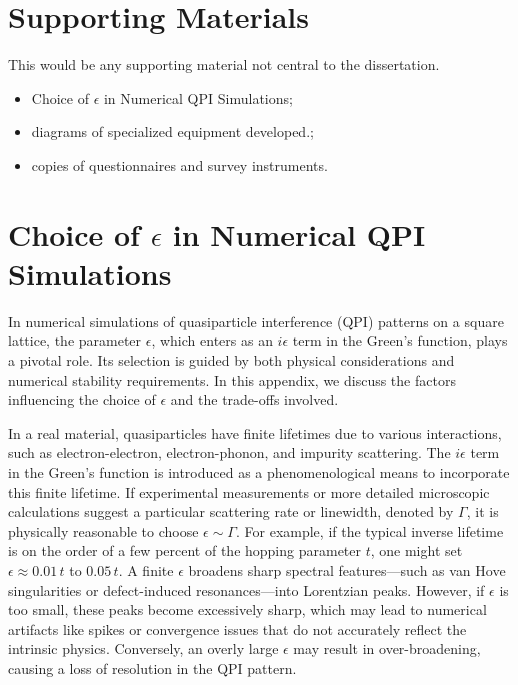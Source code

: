 \chapter{Supporting Materials}

This would be any supporting material not central to the dissertation.

\begin{itemize}
\item Choice of $\epsilon$ in Numerical QPI Simulations;
\item diagrams of specialized equipment developed.;
\item copies of questionnaires and survey instruments.
\end{itemize}

\chapter{Choice of $\epsilon$ in Numerical QPI Simulations}
\label{app:epsilon}

In numerical simulations of quasiparticle interference (QPI) patterns on a square lattice, the parameter $\epsilon$, which enters as an $i\epsilon$ term in the Green's function, plays a pivotal role. Its selection is guided by both physical considerations and numerical stability requirements. In this appendix, we discuss the factors influencing the choice of $\epsilon$ and the trade-offs involved.

In a real material, quasiparticles have finite lifetimes due to various interactions, such as electron-electron, electron-phonon, and impurity scattering. The $i\epsilon$ term in the Green’s function is introduced as a phenomenological means to incorporate this finite lifetime. If experimental measurements or more detailed microscopic calculations suggest a particular scattering rate or linewidth, denoted by $\Gamma$, it is physically reasonable to choose $\epsilon \sim \Gamma$. For example, if the typical inverse lifetime is on the order of a few percent of the hopping parameter $t$, one might set $\epsilon \approx 0.01\,t$ to $0.05\,t$. A finite $\epsilon$ broadens sharp spectral features—such as van Hove singularities or defect-induced resonances—into Lorentzian peaks. However, if $\epsilon$ is too small, these peaks become excessively sharp, which may lead to numerical artifacts like spikes or convergence issues that do not accurately reflect the intrinsic physics. Conversely, an overly large $\epsilon$ may result in over-broadening, causing a loss of resolution in the QPI pattern.

